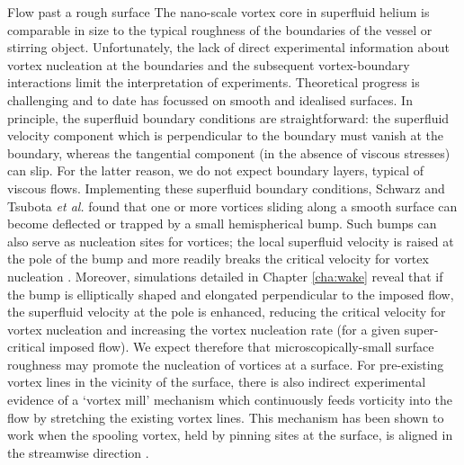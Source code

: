 \begin{chapter}{\label{cha:afm}Flow past a rough surface}
The nano-scale vortex core in superfluid helium is comparable in size 
to the typical roughness of the boundaries of the vessel or stirring object. 
Unfortunately, the lack of direct experimental information about vortex 
nucleation at the boundaries and the subsequent vortex-boundary interactions
limit the interpretation of experiments. Theoretical
progress is challenging and to date has focussed on smooth and idealised surfaces.  In principle, the superfluid boundary conditions
are straightforward:
the superfluid velocity
component which is perpendicular to the boundary must vanish
at the boundary, whereas the tangential component (in the absence of
viscous stresses) can slip.  For the latter reason, we do not expect boundary layers,
typical of viscous flows.   
Implementing these {superfluid} boundary conditions, 
Schwarz \cite{Schwarz-bump}
and Tsubota {\it et al.} \cite{PhysRevB.50.579}
found that one or more vortices sliding along a smooth surface
can become deflected or trapped by a small
hemispherical bump.  Such bumps can also serve as nucleation sites for vortices;  the local superfluid velocity is raised at the pole of the bump and more readily breaks the critical velocity for vortex nucleation \cite{win01}.  Moreover, simulations detailed in Chapter \ref{cha:wake} reveal that if the bump is elliptically shaped and elongated perpendicular to the imposed flow, the superfluid velocity at the pole
is enhanced, reducing the critical velocity for vortex nucleation and increasing the vortex nucleation rate (for a given super-critical imposed flow). 
We expect therefore that microscopically-small surface roughness may promote the nucleation of vortices at a surface.
For pre-existing vortex lines in the vicinity of the surface, there is also indirect experimental evidence of a `vortex mill' mechanism 
which continuously feeds vorticity into the flow by stretching 
{the existing vortex} lines. This mechanism has been shown to work when the spooling vortex, 
held by pinning sites at the surface, is aligned in the streamwise direction \cite{PhysRevLett.64.1130}.


\end{chapter}
